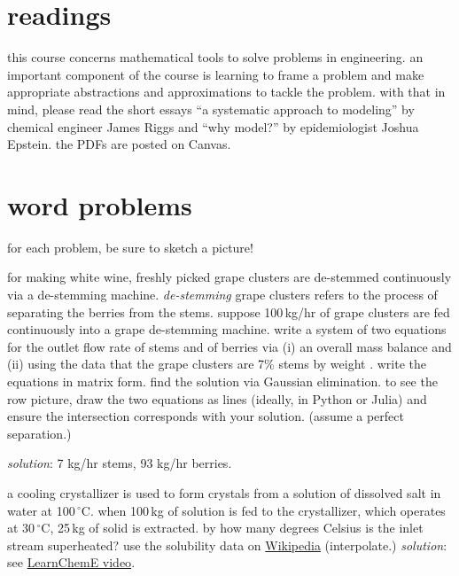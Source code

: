\documentclass[addpoints]{exam}
\begin{document}
\begin{questions}

\section*{readings}

\question this course concerns mathematical tools to solve problems in engineering. an important component of the course is learning to frame a problem and make appropriate abstractions and approximations to tackle the problem. with that in mind, please read the short essays ``a systematic approach to modeling'' by chemical engineer James Riggs \cite{riggs} and ``why model?'' \cite{whymodel} by epidemiologist Joshua Epstein. the PDFs are posted on Canvas. 

\section*{word problems}
for each problem, be sure to sketch a picture!

\question for making white wine, freshly picked grape clusters are de-stemmed continuously via a de-stemming machine. \emph{de-stemming} grape clusters refers to the process of separating the berries from the stems. suppose 100\,kg/hr of grape clusters are fed continuously into a grape de-stemming machine. write a system of two equations for the outlet flow rate of stems and of berries via (i) an overall mass balance and (ii) using the data that the grape clusters are 7\% stems by weight \cite{grapes}. write the equations in matrix form. find the solution via Gaussian elimination. to see the row picture, draw the two equations as lines (ideally, in Python or Julia) and ensure the intersection corresponds with your solution. (assume a perfect separation.)

\textit{solution}: 7 kg/hr stems, 93 kg/hr berries.

\question a cooling crystallizer is used to form  crystals from a solution of dissolved salt in water at 100\,$^\circ$C. when 100\,kg of solution is fed to the crystallizer, which operates at 30\,$^\circ$C, 25\,kg of solid  is extracted. by how many degrees Celsius is the inlet stream superheated? use the solubility data on \href{https://en.wikipedia.org/wiki/Solubility_table}{Wikipedia} (interpolate.)
\newline \textit{solution}: see \href{https://www.youtube.com/watch?v=2O4OfhqNbcs}{LearnChemE video}.


\end{questions}
\end{document}
